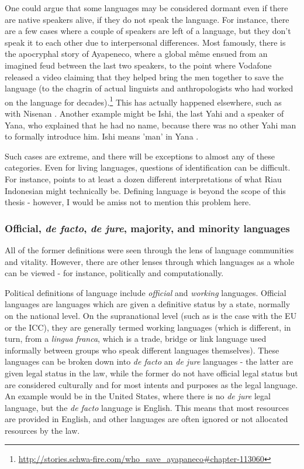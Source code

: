 One could argue that some languages may be considered dormant even if there are native speakers alive, if they do not speak the language. For instance, there are a few cases where a couple of speakers are left of a language, but they don't speak it to each other due to interpersonal differences. Most famously, there is the apocryphal story of Ayapeneco, where a global m\^eme ensued from an imagined feud between the last two speakers, to the point where Vodafone released a video claiming that they helped bring the men together to save the language (to the chagrin of actual linguists and anthropologists who had worked on the language for decades).\footnote{\href{http://stories.schwa-fire.com/who\_save\_ayapaneco\#chapter-113060}{http://stories.schwa-fire.com/who\_save\_ayapaneco\#chapter-113060}} This has actually happened elsewhere, such as with Nisenan \citep{snyder2004practice}. Another example might be Ishi, the last Yahi and a speaker of Yana, who explained that he had no name, because there was no other Yahi man to formally introduce him. Ishi means 'man' in Yana \citep{kroeber1973ishi}.

Such cases are extreme, and there will be exceptions to almost any of these categories. Even for living languages, questions of identification can be difficult. For instance, \cite{gilRiau} points to at least a dozen different interpretations of what Riau Indonesian might technically be. Defining language is beyond the scope of this thesis - however, I would be amiss not to mention this problem here.

\subsubsection{Official, \textit{de facto}, \textit{de jure}, majority, and minority languages}

All of the former definitions were seen through the lens of language communities and vitality. However, there are other lenses through which languages as a whole can be viewed - for instance, politically and computationally.

Political definitions of language include \textit{official} and \textit{working} languages. Official languages are languages which are given a definitive status by a state, normally on the national level. On the supranational level (such as is the case with the EU or the ICC), they are generally termed working languages (which is different, in turn, from a \textit{lingua franca}, which is a trade, bridge or link language used informally between groups who speak different languages themselves). These languages can be broken down into {\it de facto} an {\it de jure} languages - the latter are given legal status in the law, while the former do not have official legal status but are considered culturally and for most intents and purposes as the legal language. An example would be in the United States, where there is no {\it de jure} legal language, but the {\it de facto} language is English. This means that most resources are provided in English, and other languages are often ignored or not allocated resources by the law.

